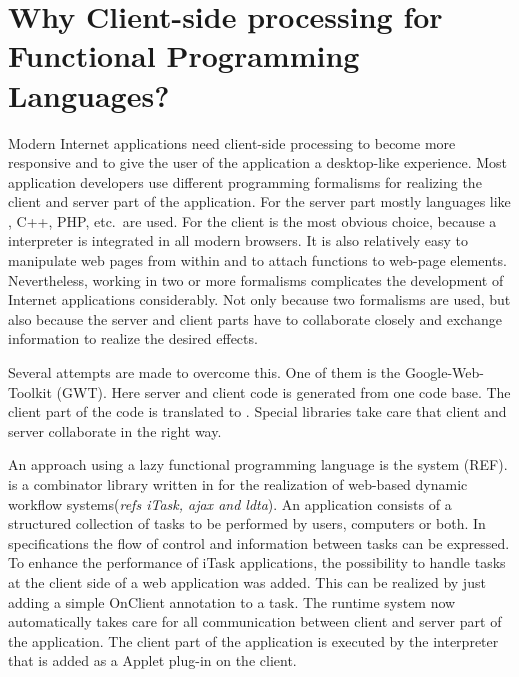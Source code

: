 \section{Why Client-side processing for Functional Programming Languages?} \label{sapljs:sec:motivation}
Modern Internet applications need client-side processing to become more responsive and to give 
the user of the application a desktop-like experience.
Most application developers use different programming formalisms for realizing the client and server part of the application.
For the server part mostly languages like \Java, \textsf{C++}, \textsf{PHP}, etc.\ are used.
For the client \JS is the most obvious choice, because a \JS interpreter is integrated in all modern browsers.
It is also relatively easy to manipulate web pages from within \JS and to attach \JS functions to web-page elements.
Nevertheless, working in two or more formalisms complicates the development of Internet applications considerably. 
Not only because two formalisms are used, but also because the server and client parts have to collaborate closely
and exchange information to realize the desired effects.

Several attempts are made to overcome this. One of them is the Google-Web-Toolkit (\textsf{GWT}). 
Here server and client code is generated from one \Java code base. 
The client part of the code is translated to \JS.
Special libraries take care that client and server collaborate in the right way.

An  approach using a lazy functional programming language is the \iTask system (REF). 
\iTask is a combinator library written in  \Clean 
for the realization of web-based dynamic workflow systems(\emph{refs iTask, ajax and ldta}). 
An \iTask application consists of a structured collection of tasks to be performed by users, 
computers or both.
In \iTask specifications the flow of control and information between tasks can be expressed. 
To enhance the performance of \textsf{iTask} applications, 
the possibility to handle tasks at the client side of a web application was added. 
This can be realized by just adding a simple \textsf{OnClient} annotation to a task. 
The \iTask runtime system now automatically takes care for all communication between 
client and server part of the application. The client part of the application is executed
by the \Sapl interpreter that is added as a \Java Applet plug-in on the client.

